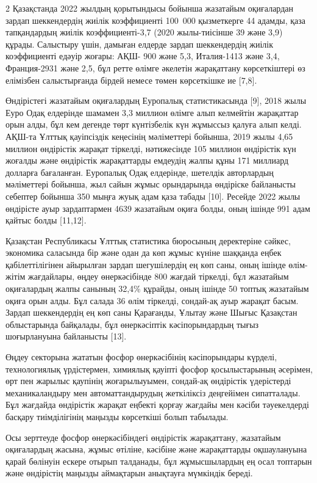 \begin{multicols}{2}
Қазақстанда 2022 жылдың қорытындысы бойынша жазатайым оқиғалардан зардап
шеккендердің жиілік коэффициенті 100~000 қызметкерге 44 адамды, қаза
тапқандардың жиілік коэффициенті-3,7 (2020 жылы-тиісінше 39 және 3,9)
құрады. Салыстыру үшін, дамыған елдерде зардап шеккендердің жиілік
коэффициенті едәуір жоғары: АҚШ- 900 және 5,3, Италия-1413 және 3,4,
Франция-2931 және 2,5, бұл ретте өлімге әкелетін жарақаттану
көрсеткіштері өз елімізбен салыстырғанда бірдей немесе төмен көрсеткішке
ие {[}7,8{]}.

Өндірістегі жазатайым оқиғалардың Еуропалық статистикасында {[}9{]},
2018 жылы Еуро Одақ елдерінде шамамен 3,3 миллион өлімге алып келмейтін
жарақаттар орын алды, бұл кем дегенде төрт күнтізбелік күн жұмыссыз
қалуға алып келді. АҚШ-та Ұлттық қауіпсіздік кеңесінің мәліметтері
бойынша, 2019 жылы 4,65 миллион өндірістік жарақат тіркелді, нәтижесінде
105 миллион өндірістік күн жоғалды және өндірістік жарақаттарды емдеудің
жалпы құны 171 миллиард долларға бағаланған. Еуропалық Одақ елдерінде,
шетелдік авторлардың мәліметтері бойынша, жыл сайын жұмыс орындарында
өндіріске байланысты себептер бойынша 350 мыңға жуық адам қаза табады
{[}10{]}. Ресейде 2022 жылы өндірісте ауыр зардаптармен 4639 жазатайым
оқиға болды, оның ішінде 991 адам қайтыс болды {[}11,12{]}.

Қазақстан Республикасы Ұлттық статистика бюросының деректеріне сәйкес,
экономика саласында бір және одан да көп жұмыс күніне шаққанда еңбек
қабілеттілігінен айырылған зардап шегушілердің ең көп саны, оның ішінде
өлім-жітім жағдайлары, өңдеу өнеркәсібінде 800 жағдай тіркелді, бұл
жазатайым оқиғалардың жалпы санының 32,4\% құрайды, оның ішінде 50
топтық жазатайым оқиға орын алды. Бұл салада 36 өлім тіркелді, сондай-ақ
ауыр жарақат басым. Зардап шеккендердің ең көп саны Қарағанды, Ұлытау
және Шығыс Қазақстан облыстарында байқалады, бұл өнеркәсіптік
кәсіпорындардың тығыз шоғырлануына байланысты {[}13{]}.

Өңдеу секторына жататын фосфор өнеркәсібінің кәсіпорындары күрделі,
технологиялық үрдістермен, химиялық қауіпті фосфор қосылыстарының
әсерімен, өрт пен жарылыс қаупінің жоғарылыуымен, сондай-ақ өндірістік
үдерістерді механикаландыру мен автоматтандырудың жеткіліксіз деңгейімен
сипатталады. Бұл жағдайда өндірістік жарақат еңбекті қорғау жағдайы мен
кәсіби тәуекелдерді басқару тиімділігінің маңызды көрсеткіші болып
табылады.

Осы зерттеуде фосфор өнеркәсібіндегі өндірістік жарақаттану, жазатайым
оқиғалардың жасына, жұмыс өтіліне, кәсібіне және жарақаттарды
оқшаулануына қарай бөлінуін ескере отырып талданады, бұл жұмысшылардың
ең осал топтарын және өндірістің маңызды аймақтарын анықтауға мүмкіндік
береді.


\end{multicols}
